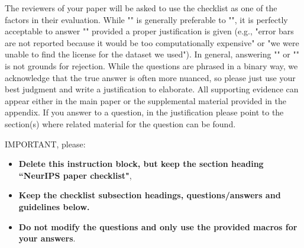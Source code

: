 \documentclass{article}
\begin{document}
The reviewers of your paper will be asked to use the checklist as one of the factors in their evaluation. While "\answerYes{}" is generally preferable to "\answerNo{}", it is perfectly acceptable to answer "\answerNo{}" provided a proper justification is given (e.g., "error bars are not reported because it would be too computationally expensive" or "we were unable to find the license for the dataset we used"). In general, answering "\answerNo{}" or "\answerNA{}" is not grounds for rejection. While the questions are phrased in a binary way, we acknowledge that the true answer is often more nuanced, so please just use your best judgment and write a justification to elaborate. All supporting evidence can appear either in the main paper or the supplemental material provided in the appendix. If you answer \answerYes{} to a question, in the justification please point to the section(s) where related material for the question can be found.

IMPORTANT, please:
\begin{itemize}
    \item {\bf Delete this instruction block, but keep the section heading ``NeurIPS paper checklist"},
    \item  {\bf Keep the checklist subsection headings, questions/answers and guidelines below.}
    \item {\bf Do not modify the questions and only use the provided macros for your answers}.
\end{itemize} 
 

\fi
\end{document}

